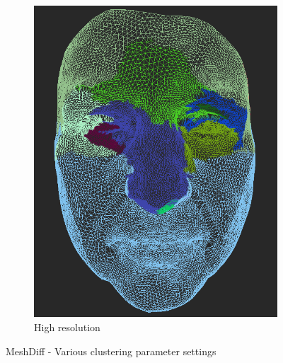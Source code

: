 \begin{figure}[h]
\begin{subfigure}{0.4\textwidth}
	\includegraphics[width=\textwidth]{./img/meshdiff-high_resolution.PNG}
	\caption{High resolution}
	\label{fig:meshdiff-high_resolution}
	\end{subfigure}
\caption[MeshDiff - Various clustering parameter settings]{MeshDiff - Various clustering parameter settings}
\end{figure}